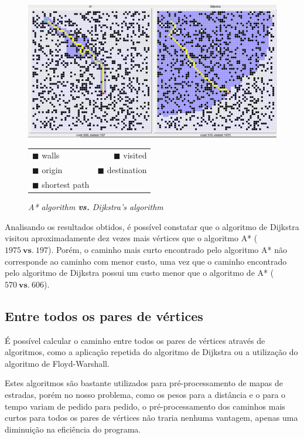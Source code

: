\documentclass[article, a4paper, 12pt, oneside]{memoir}
\begin{document}
\begin{figure}[h]
\centering
\includegraphics[scale=0.4]{pathfinder2}
\caption{\emph{A* algorithm \textbf{vs.} Dijkstra's algorithm}}
\begin{tabular}{ l r }
\color{black} $\blacksquare$ \color{black} walls & \color{Periwinkle} $\blacksquare$ \color{black} visited \\
\color{green} $\blacksquare$ \color{black} origin & \color{red} $\blacksquare$ \color{black} destination \\
\color{yellow} $\blacksquare$ \color{black} shortest path
\end{tabular}
\end{figure}

Analisando os resultados obtidos, é possível constatar que o algoritmo de Dijkstra visitou aproximadamente dez vezes mais vértices que o algoritmo A* ($1975 ~ \textbf{vs.} ~ 197$). Porém, o caminho mais curto encontrado pelo algoritmo A* não corresponde ao caminho com menor custo, uma vez que o caminho encontrado pelo algoritmo de Dijkstra possui um custo menor que o algoritmo de A* ($570 ~ \textbf{vs.} ~ 606$).

\subsection{Entre todos os pares de vértices}
É possível calcular o caminho entre todos os pares de vértices através de algoritmos, como a aplicação repetida do algoritmo de Dijkstra ou a utilização do algoritmo de Floyd-Warshall.

Estes algoritmos são bastante utilizados para pré-processamento de mapas de estradas, porém no nosso problema, como os pesos para a distância e o para o tempo variam de pedido para pedido, o pré-processamento dos caminhos mais curtos para todos os pares de vértices não traria nenhuma vantagem, apenas uma diminuição na eficiência do programa.
\end{document}
